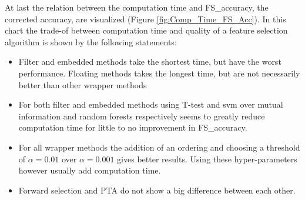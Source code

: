 	At last the relation between the computation time and FS\_accuracy, the corrected accuracy, are visualized (Figure \ref{fig:Comp_Time_FS_Acc}). In this chart the trade-of between computation time and quality of a feature selection algorithm is  shown by the following statements: 
	\begin{itemize}
		\item Filter and embedded methods take the shortest time, but have the worst performance. Floating methods takes the longest time, but are not necessarily better than other wrapper methods
		\item For both filter and embedded methods using T-test and svm over mutual information and random forests respectively seems to greatly reduce computation time for little to no improvement in FS\_accuracy.
		\item For all wrapper methods the addition of an ordering and choosing a threshold of $\alpha = 0.01$ over $\alpha = 0.001$ gives better results. Using these hyper-parameters however usually add computation time.
		\item Forward selection and PTA do not show a big difference between each other.
	\end{itemize}
	
